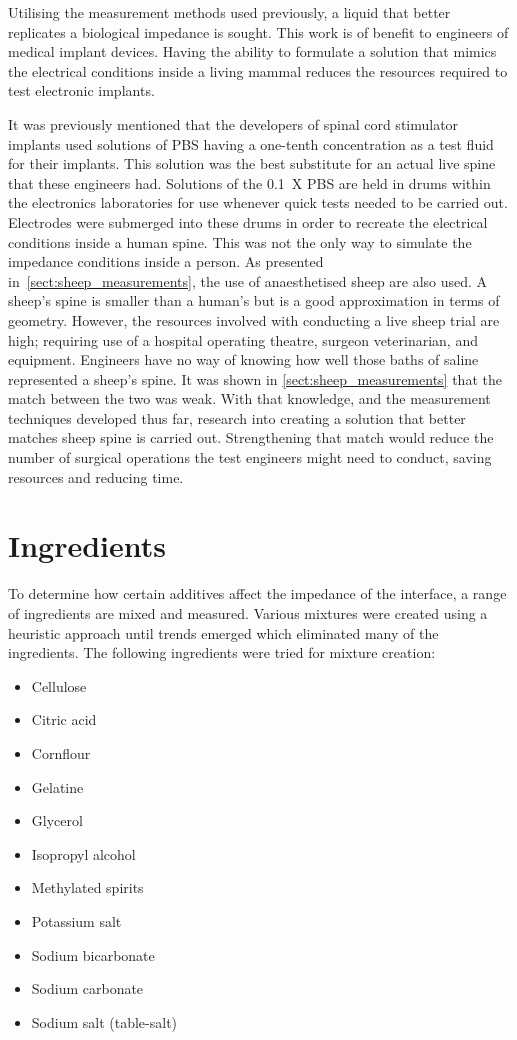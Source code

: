 
Utilising the measurement methods used previously, a liquid that better replicates a biological impedance is sought.
This work is of benefit to engineers of medical implant devices.
Having the ability to formulate a solution that mimics the electrical conditions inside a living mammal reduces the resources required to test electronic implants.

It was previously mentioned that the developers of spinal cord stimulator implants used solutions of PBS having a one-tenth concentration as a test fluid for their implants.
This solution was the best substitute for an actual live spine that these engineers had.
Solutions of the \SI{0.1}{X} PBS are held in drums within the electronics laboratories for use whenever quick tests needed to be carried out.
Electrodes were submerged into these drums in order to recreate the electrical conditions inside a human spine.
This was not the only way to simulate the impedance conditions inside a person.
As presented in~\cref{sect:sheep_measurements}, the use of anaesthetised sheep are also used.
A sheep's spine is smaller than a human's but is a good approximation in terms of geometry.
However, the resources involved with conducting a live sheep trial are high; requiring use of a hospital operating theatre, surgeon veterinarian, and equipment.
Engineers have no way of knowing how well those baths of saline represented a sheep's spine.
It was shown in \cref{sect:sheep_measurements} that the match between the two was weak.
With that knowledge, and the measurement techniques developed thus far, research into creating a solution that better matches sheep spine is carried out.
Strengthening that match would reduce the number of surgical operations the test engineers might need to conduct, saving resources and reducing time.

\section{Ingredients}

  To determine how certain additives affect the impedance of the interface, a range of ingredients are mixed and measured.
  Various mixtures were created using a heuristic approach until trends emerged which eliminated many of the ingredients.
  The following ingredients were tried for mixture creation:
  \begin{itemize}
      \item Cellulose
      \item Citric acid
      \item Cornflour
      \item Gelatine
      \item Glycerol
      \item Isopropyl alcohol
      \item Methylated spirits
      \item Potassium salt
      \item Sodium bicarbonate
      \item Sodium carbonate
      \item Sodium salt (table-salt)
  \end{itemize}

